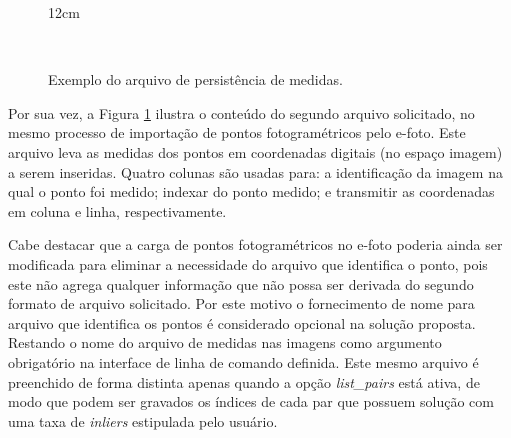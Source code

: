 \begin{figure}[!ht]{12cm}
  \caption{Exemplo do arquivo de persistência de medidas.} \label{Exemp_saida}
  \hfill
  \\
\end{figure}

Por sua vez, a Figura \ref{Exemp_saida} ilustra o conteúdo do segundo arquivo solicitado, no mesmo processo de importação de pontos fotogramétricos pelo e-foto. Este arquivo leva as medidas dos pontos em coordenadas digitais (no espaço imagem) a serem inseridas. Quatro colunas são usadas para: a identificação da imagem na qual o ponto foi medido; indexar do ponto medido; e transmitir as coordenadas em coluna e linha, respectivamente. 

Cabe destacar que a carga de pontos fotogramétricos no e-foto poderia ainda ser modificada para eliminar a necessidade do arquivo que identifica o ponto, pois este não agrega qualquer informação que não possa ser derivada do segundo formato de arquivo solicitado. Por este motivo o fornecimento de nome para arquivo que identifica os pontos é considerado opcional na solução proposta. Restando o nome do arquivo de medidas nas imagens como argumento obrigatório na interface de linha de comando definida. Este mesmo arquivo é preenchido de forma distinta apenas quando a opção \textit{list\_pairs} está ativa, de modo que podem ser gravados os índices de cada par que possuem solução com uma taxa de \textit{inliers} estipulada pelo usuário.

